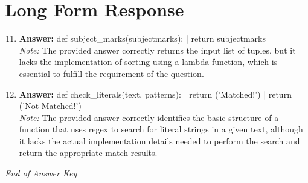 \documentclass[12pt]{article}
\begin{document}
\section*{Long Form Response}
\begin{enumerate}[label=\arabic*.]
\setcounter{enumi}{10}
\item \textbf{Answer:} def subject\_marks(subjectmarks): | return subjectmarks
\\ \textit{Note:} The provided answer correctly returns the input list of tuples, but it lacks the implementation of sorting using a lambda function, which is essential to fulfill the requirement of the question.
\item \textbf{Answer:} def check\_literals(text, patterns): | return ('Matched!') | return ('Not Matched!')
\\ \textit{Note:} The provided answer correctly identifies the basic structure of a function that uses regex to search for literal strings in a given text, although it lacks the actual implementation details needed to perform the search and return the appropriate match results.
\end{enumerate}

\vfill
\noindent\textit{End of Answer Key}
\end{document}
